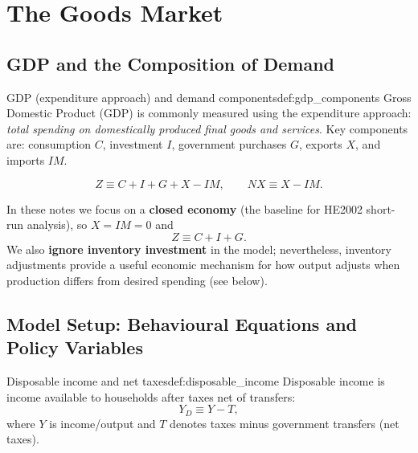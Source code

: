 
\section{The Goods Market}

\subsection{GDP and the Composition of Demand}

\begin{definition}{GDP (expenditure approach) and demand components}{def:gdp_components}
Gross Domestic Product (GDP) is commonly measured using the expenditure approach:
\emph{total spending on domestically produced final goods and services}.
Key components are:
consumption $C$, investment $I$, government purchases $G$, exports $X$, and imports $IM$.
\end{definition}

\begin{keyformula}[title={Key Formula: Total demand for goods}]
\[
Z \equiv C + I + G + X - IM,
\qquad
NX \equiv X-IM.
\]
\end{keyformula}

\noindent
In these notes we focus on a \textbf{closed economy} (the baseline for HE2002 short-run analysis), so $X=IM=0$ and
\[
Z \equiv C + I + G.
\]
We also \textbf{ignore inventory investment} in the model; nevertheless, inventory adjustments provide a useful
economic mechanism for how output adjusts when production differs from desired spending (see below).

\subsection{Model Setup: Behavioural Equations and Policy Variables}

\begin{definition}{Disposable income and net taxes}{def:disposable_income}
Disposable income is income available to households after taxes net of transfers:
\[
Y_D \equiv Y - T,
\]
where $Y$ is income/output and $T$ denotes taxes minus government transfers (net taxes).
\end{definition}

